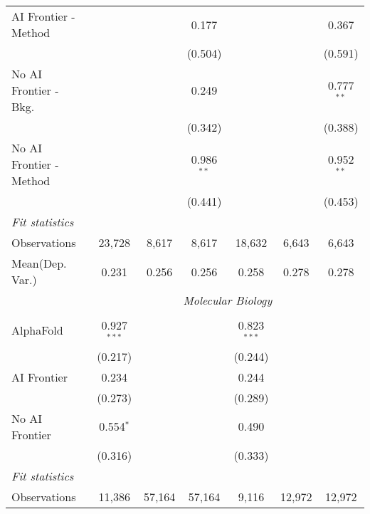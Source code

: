 \begin{tabular}{lcccccc}
   AI Frontier - Method    &               &               & 0.177        &               &              & 0.367\\   
                           &               &               & (0.504)      &               &              & (0.591)\\   
   No AI Frontier - Bkg.   &               &               & 0.249        &               &              & 0.777$^{**}$\\   
                           &               &               & (0.342)      &               &              & (0.388)\\   
   No AI Frontier - Method &               &               & 0.986$^{**}$ &               &              & 0.952$^{**}$\\   
                           &               &               & (0.441)      &               &              & (0.453)\\   
   \midrule
   \emph{Fit statistics}\\
   Observations            & 23,728        & 8,617         & 8,617        & 18,632        & 6,643        & 6,643\\  
Mean(Dep. Var.) & 0.231 & 0.256 & 0.256 & 0.258 & 0.278 & 0.278 \\
   
 & \multicolumn{6}{c}{\textit{Molecular Biology}} \\ \\
   AlphaFold      & 0.927$^{***}$ &        &        & 0.823$^{***}$ &        &   \\   
                  & (0.217)       &        &        & (0.244)       &        &   \\   
   AI Frontier    & 0.234         &        &        & 0.244         &        &   \\   
                  & (0.273)       &        &        & (0.289)       &        &   \\   
   No AI Frontier & 0.554$^{*}$   &        &        & 0.490         &        &   \\   
                  & (0.316)       &        &        & (0.333)       &        &   \\   
   \midrule
   \emph{Fit statistics}\\
   Observations   & 11,386        & 57,164 & 57,164 & 9,116         & 12,972 & 12,972\\  
   

\end{tabular}
